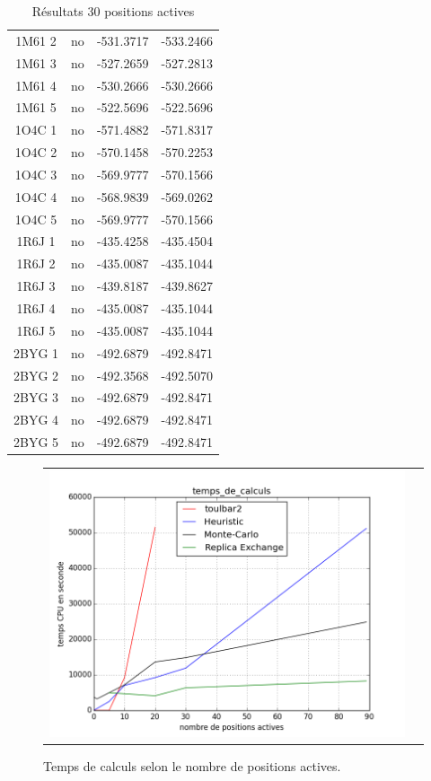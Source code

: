 \documentclass[a4paper,12pt]{article}
\begin{document}
\begin{table}[!htbp]
\begin{tabular}{|c|c|c|c|}
        1M61 2 & no & -531.3717 & -533.2466 \\
        1M61 3 & no & -527.2659 & -527.2813 \\
        1M61 4 & no & -530.2666 & -530.2666 \\
        1M61 5 & no & -522.5696 & -522.5696 \\
        1O4C 1 & no & -571.4882 & -571.8317 \\
        1O4C 2 & no & -570.1458 & -570.2253 \\
        1O4C 3 & no & -569.9777 & -570.1566 \\
        1O4C 4 & no & -568.9839 & -569.0262 \\
        1O4C 5 & no & -569.9777 & -570.1566 \\
        1R6J 1 & no & -435.4258 & -435.4504 \\
        1R6J 2 & no & -435.0087 & -435.1044 \\
        1R6J 3 & no & -439.8187 & -439.8627 \\
        1R6J 4 & no & -435.0087 & -435.1044 \\
        1R6J 5 & no & -435.0087 & -435.1044 \\
        2BYG 1 & no & -492.6879 & -492.8471 \\
        2BYG 2 & no & -492.3568 & -492.5070 \\
        2BYG 3 & no & -492.6879 & -492.8471 \\
        2BYG 4 & no & -492.6879 & -492.8471 \\
        2BYG 5 & no & -492.6879 & -492.8471 \\
        
        \hline



 \end{tabular}      
 \caption{Résultats 30 positions actives }
 \label{tab_echec2BYG__1}      
\end{table}


   \begin{figure}[t]
     \centering
     \begin{tabular}{cc}
       \includegraphics[width=12cm]{image/temps_de_calculs.png} &
     \end{tabular}
     
     \caption{Temps de calculs selon le nombre de positions actives.}
     \label{temps_CPU}
   \end{figure}
\end{document}
